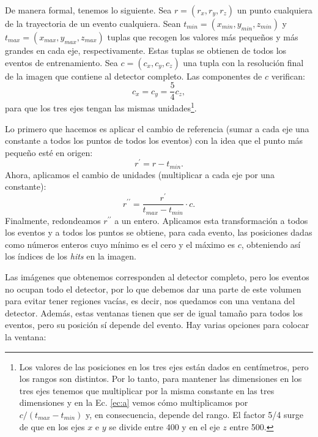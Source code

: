 \documentclass[a4paper,12pt,oneside,titlepage]{book}
\begin{document}
De manera formal, tenemos lo siguiente. Sea ${r} = (r_x, r_y, r_z)$ un punto cualquiera de la trayectoria de un evento cualquiera. Sean $t_{min} = (x_{min}, y_{min}, z_{min})$ y $t_{max} = (x_{max}, y_{max}, z_{max})$ tuplas que recogen los valores más pequeños y más grandes en cada eje, respectivamente. Estas tuplas se obtienen de todos los eventos de entrenamiento. Sea  $c = (c_x, c_y, c_z)$ una tupla con la resolución final de la imagen que contiene al detector completo. Las componentes de $c$ verifican:
\begin{equation}
  \label{eq:resolucion}
  c_x = c_y = \frac{5}{4}c_z,
\end{equation}
para que los tres ejes tengan las mismas unidades\footnote{Los valores de las posiciones en los tres ejes están dados en centímetros, pero los rangos son distintos. Por lo tanto, para mantener las dimensiones en los tres ejes tenemos que multiplicar por la misma constante en las tres dimensiones y en la Ec. \ref{ec:a} vemos cómo multiplicamos por $c / (t_{max} - t_{min})$ y, en consecuencia, depende del rango. El factor 5/4 surge de que en los ejes $x$ e $y$ se divide entre 400 y en el eje $z$ entre 500.}.

Lo primero que hacemos es aplicar el cambio de referencia (sumar a cada eje una constante a todos los puntos de todos los eventos) con la idea que el punto más pequeño esté en origen:
\begin{equation}
  {r}^\prime = {r} - t_{min}.
\end{equation}
Ahora, aplicamos el cambio de unidades (multiplicar a cada eje por una constante):
\begin{equation}
  \label{ec:a}
  {r}^{\prime\prime} = \frac{{r}^\prime}{t_{max} - t_{min}} \cdot c.
\end{equation}
Finalmente, redondeamos $r^{\prime\prime}$ a un entero. Aplicamos esta transformación a todos los eventos y a todos los puntos se obtiene, para cada evento, las posiciones dadas como números enteros cuyo mínimo es el cero y el máximo es $c$, obteniendo así los índices de los \textit{hits} en la imagen.

Las imágenes que obtenemos corresponden al detector completo, pero los eventos no ocupan todo el detector, por lo que debemos dar una parte de este volumen para evitar tener regiones vacías, es decir, nos quedamos con una ventana del detector. Además, estas ventanas tienen que ser de igual tamaño para todos los eventos, pero su posición sí depende del evento. Hay varias opciones para colocar la ventana:
\end{document}
